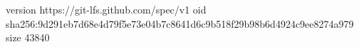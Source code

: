 version https://git-lfs.github.com/spec/v1
oid sha256:9d291eb7d68e4d79f5e73e04b7c8641d6c9b518f29b98b6d4924c9ee8274a979
size 43840
